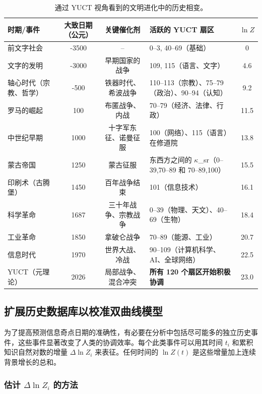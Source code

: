 \documentclass[12pt,a4paper]{article}
\theoremstyle{remark}
\begin{document}
		\begin{table}[htbp]
			\centering
			\caption{通过 YUCT 视角看到的文明进化中的历史相变。}
			\label{tab:historical-transitions}
			\scriptsize  
			\begin{tabular}{p{2.2cm} c c p{5.5cm} c}
				\toprule
				\textbf{时期/事件} & \textbf{大致日期（公元）} & \textbf{关键催化剂} & \textbf{活跃的 YUCT 扇区} & $\ln Z$ \\
				\midrule
				前文字社会 & -3500 & – & 0–3, 40–69（基础） & 0 \\
				文字的发明 & -3000 & 早期国家的战争 & 109, 115（语言、文字） & 4.6 \\
				轴心时代（宗教、哲学） & -500 & 铁器时代、希波战争 & 110–113（宗教）、75–79（政治）、90–94（认知） & 9.2 \\
				罗马的崛起 & 100 & 布匿战争、内战 & 70–79（经济、法律、行政） & 11.5 \\
				中世纪早期 & 1000 & 十字军东征、诺曼征服 & 100（网络）、115（语言）在修道院 & 13.8 \\
				蒙古帝国 & 1250 & 蒙古征服 & 东西方之间的 $\kappa$\_sr（0–39,70–89 和 70–89,100） & 15.5 \\
				印刷术（古腾堡） & 1450 & 百年战争结束 & 101（信息技术） & 16.1 \\
				科学革命 & 1687 & 三十年战争、宗教战争 & 0–39（物理、天文）、40–69（生物） & 18.4 \\
				工业革命 & 1850 & 拿破仑战争 & 70–89（能源、工业） & 20.7 \\
				信息时代 & 1970 & 世界大战、冷战 & 90–109（计算机科学、AI、全球网络） & 22.5 \\
				YUCT（元理论） & 2026 & 局部战争、混合冲突 & \textbf{所有 120 个扇区开始积极协调} & 23.0 \\
				\bottomrule
			\end{tabular}
		\end{table}
		
		\subsection{扩展历史数据库以校准双曲线模型}
		\label{subsec:historical-data}
		
		为了提高预测信息奇点日期的准确性，有必要在分析中包括尽可能多的独立历史事件，这些事件显著改变了人类的协调效率。每个此类事件可以用其时间 $t_i$ 和累积知识自然对数的增量 $\Delta \ln Z_i$ 来表征。任何时间的 $\ln Z(t)$ 是这些增量加上连续背景增长的总和。
		
		\subsubsection{估计 $\Delta \ln Z_i$ 的方法}
		
\end{document}

